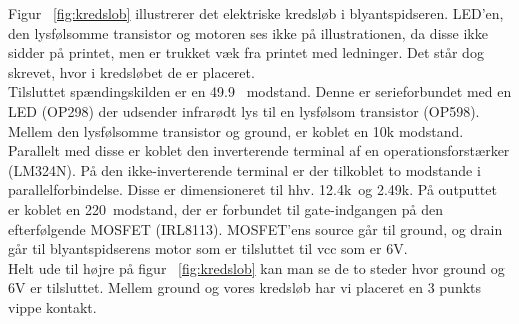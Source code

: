 Figur ~\ref{fig:kredslob} illustrerer det elektriske kredsløb i blyantspidseren. LED'en, den lysfølsomme transistor og motoren ses ikke på illustrationen, da disse ikke sidder på printet, men er trukket væk fra printet med ledninger. Det står dog skrevet, hvor i kredsløbet de er placeret. \\
Tilsluttet spændingskilden er en 49.9 \textOmega\
modstand. Denne er serieforbundet med en LED (OP298) der udsender infrarødt lys til en lysfølsom transistor (OP598). Mellem den lysfølsomme transistor og ground, er koblet en 10k \textOmega  modstand. Parallelt med disse er koblet den inverterende terminal af en operationsforstærker (LM324N). På den ikke-inverterende terminal er der tilkoblet to modstande i parallelforbindelse. Disse er dimensioneret til hhv. 12.4k\textOmega\ og 2.49k\textOmega. På outputtet er koblet en 220\textOmega\ modstand, der er forbundet til gate-indgangen på den efterfølgende MOSFET (IRL8113). MOSFET'ens source går til ground, og drain går til blyantspidserens motor som er tilsluttet til vcc som er 6V.\\
Helt ude til højre på figur ~\ref{fig:kredslob} kan man se de to steder hvor ground og 6V er tilsluttet. Mellem ground og vores kredsløb har vi placeret en 3 punkts vippe kontakt. \\


 